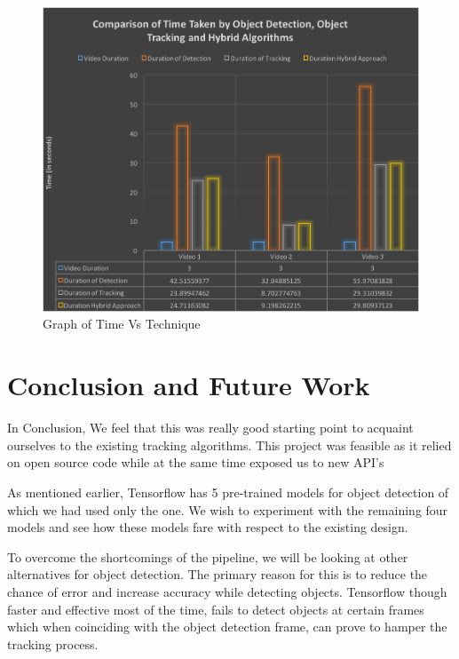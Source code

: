 \documentclass[10pt,twocolumn,letterpaper]{article}
\begin{document}
\begin{figure}
\includegraphics[width=\linewidth]{Graph.png}
\caption{Graph of Time Vs Technique}
\end{figure}
  
 

\section{Conclusion and Future Work}

In Conclusion, We feel that this was really good starting point
to acquaint ourselves to the existing tracking algorithms. This project was feasible as it relied on open source code while at the same time exposed us to new API's

As mentioned earlier, Tensorflow has 5 pre-trained models for object detection of which we had used only the one. We wish to experiment with the remaining four models and see how these models fare with respect to the existing design. 

To overcome the shortcomings of the pipeline, we will be looking at other alternatives for object detection. The primary reason for this is to reduce the chance of error and increase accuracy while detecting objects. Tensorflow though faster and effective most of the time, fails to detect objects at certain frames which when coinciding with the object detection frame, can prove to hamper the tracking process.
\end{document}
